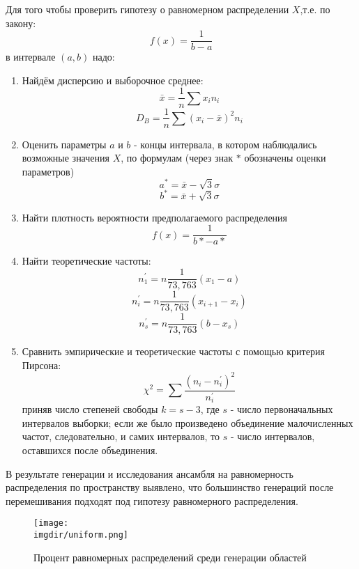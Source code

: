 Для того чтобы проверить гипотезу о равномерном распределении $X$,т.е. по закону: $$f(x) = \frac{1}{b-a}$$ в интервале $(a,b)$
надо:
\begin{enumerate}
    \item 
        Найдём дисперсию и выборочное среднее:
        $$
        \bar{x}=\frac{1}{n} \sum x_{i} n_{i}
        $$
        $$
        D_{B}=\frac{1}{n} \sum\left(x_{i}-\bar{x}\right)^{2} n_{i}
        $$
    \item
        Оценить параметры $a$ и $b$ - концы интервала, в котором наблюдались возможные значения $X$, по формулам (через знак $*$ обозначены оценки параметров) $$a^{*}=\bar{x}-\sqrt{3} \sigma$$
        $$b^{*}=\bar{x}+\sqrt{3} \sigma$$
    \item 
        Найти плотность вероятности предполагаемого распределения 
        $$f(x) = \frac{1}{b* - a*}$$
    \item
        Найти теоретические частоты:
        $$
        n_{1}^{\prime}=n \frac{1}{73,763}\left(x_{1}-a\right)
        $$ 
        $$
        n_{i}^{\prime}=n \frac{1}{73,763}\left(x_{i+1}-x_{i}\right)
        $$
        $$
        n_{s}^{\prime}=n \frac{1}{73,763}\left(b-x_{s}\right)
        $$
    \item
        Сравнить эмпирические и теоретические частоты с помощью критерия Пирсона: 
        $$
        \chi^{2}=\sum \frac{\left(n_{i}-n_{i}^{\prime}\right)^{2}}{n_{i}^{\prime}}
        $$
        приняв число степеней свободы $k = s - 3$, где $s$ - число первоначальных интервалов выборки; если же было произведено объединение малочисленных частот, следовательно, и самих интервалов, то $s$ - число интервалов, оставшихся после объединения.
\end{enumerate}

В результате генерации и исследования ансамбля на равномерность распределения по пространству выявлено, что большинство генераций после перемешивания подходят под гипотезу равномерного распределения.

\begin{figure}[h]
    \centering
    \texttt{[image: \\imgdir/uniform.png]}
    \caption{Процент равномерных распределений среди генерации областей}
    \label{fig:uniform}
\end{figure}